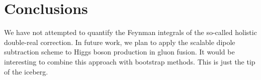 \section{Conclusions}\label{sec:conclusions}

We have not attempted to quantify the Feynman integrals of the so-called
holistic double-real correction. In future work, we plan to apply the
scalable dipole subtraction scheme to Higgs boson production in gluon
fusion. It would be interesting to combine this approach with bootstrap
methods. This is just the tip of the iceberg.

